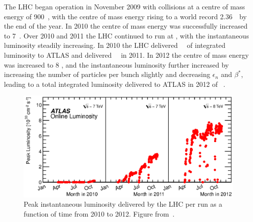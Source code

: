 The LHC began operation in November 2009 with collisions at a centre of mass
energy of 900~\GeV, with the centre of mass energy rising to a world record
2.36~\TeV\ by the end of the year. In 2010 the centre of mass energy was
successfully increased to 7~\TeV. Over 2010 and 2011 the LHC continued to run at
, with the instantaneous luminosity steadily increasing. In 2010 the
LHC delivered \LumiTotalDeliveredTwentyTen~\ipb\ of integrated luminosity to ATLAS
and delivered \LumiTotalDeliveredTwentyEleven~\ifb\ in 2011. In 2012 the centre of mass energy was
increased to 8 \tev, and the instantaneous luminosity further increased by
increasing the number of particles per bunch slightly and decreasing
$\epsilon_{n}$ and $\beta^{*}$, leading to a total integrated luminosity
delivered to ATLAS in 2012 of \LumiTotalDeliveredTwentyTwelve~\ifb. 

\begin{figure}[h]
\centering
            \includegraphics[width=\textwidth]{lumivstime}
\caption[Peak instantaneous luminosity delivered by the LHC per run as a function of time from
2010 to 2012.]{Peak instantaneous luminosity delivered by the LHC per run as a function of time from
2010 to 2012. Figure from~\cite{atlaslumipublic}.}
\label{fig:lhc-inst-lumi}
\end{figure}

